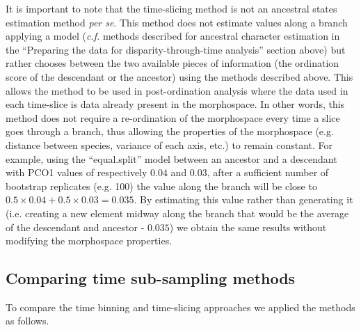 \documentclass[12pt,a4paper]{article}
\begin{document}
It is important to note that the time-slicing method is not an ancestral states estimation method \textit{per se}.
This method does not estimate values along a branch applying a model (\textit{c.f.} methods described for ancestral character estimation in the ``Preparing the data for disparity-through-time analysis'' section above) but rather chooses between the two available pieces of information (the ordination score of the descendant or the ancestor) using the methods described above.
This allows the method to be used in post-ordination analysis where the data used in each time-slice is data already present in the morphospace.
In other words, this method does not require a re-ordination of the morphospace every time a slice goes through a branch, thus allowing the properties of the morphospace (e.g. distance between species, variance of each axis, etc.) to remain constant.
For example, using the ``equal.split'' model between an ancestor and a descendant with PCO1 values of respectively $0.04$ and $0.03$, after a sufficient number of bootstrap replicates (e.g. 100) the value along the branch will be close to $0.5\times0.04 + 0.5\times0.03 = 0.035$.
By estimating this value rather than generating it (i.e. creating a new element midway along the branch that would be the average of the descendant and ancestor - $0.035$) we obtain the same results without modifying the morphospace properties.
 
\subsection{Comparing time sub-sampling methods}

To compare the time binning and time-slicing approaches we applied the methods as follows. 
\end{document}
